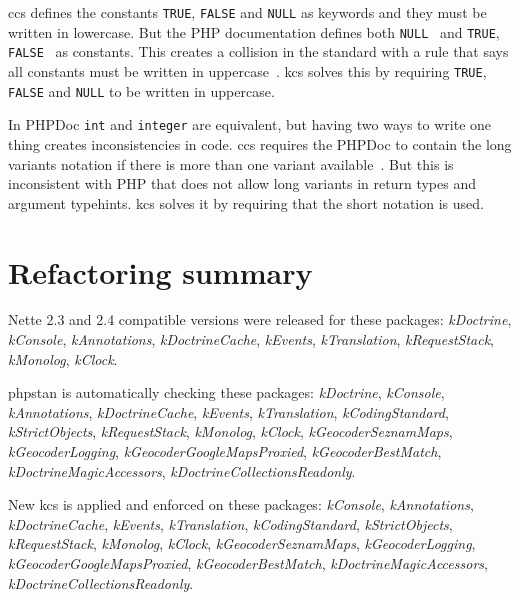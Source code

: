 \gls{ccs} defines the constants \lstinline{TRUE}, \lstinline{FALSE} and \lstinline{NULL} as keywords and they must be written in lowercase. But the PHP documentation defines both \lstinline{NULL}~\cite{php:manual:null} and \lstinline{TRUE}, \lstinline{FALSE}~\cite{php:manual:boolean} as constants. This creates a collision in the standard with a rule that says all constants must be written in uppercase~\cite{consistence:coding-standard}. \gls{kcs} solves this by requiring \lstinline{TRUE}, \lstinline{FALSE} and \lstinline{NULL} to be written in uppercase.


In PHPDoc \lstinline{int} and \lstinline{integer} are equivalent, but having two ways to write one thing creates inconsistencies in code. \gls{ccs} requires the PHPDoc to contain the long variants notation if there is more than one variant available~\cite{consistence:coding-standard}. But this is inconsistent with PHP that does not allow long variants in return types and argument typehints. \gls{kcs} solves it by requiring that the short notation is used.

\section{Refactoring summary}

Nette 2.3 and 2.4 compatible versions were released for these packages: \textit{\gls{kDoctrine}}, \textit{\gls{kConsole}}, \textit{\gls{kAnnotations}}, \textit{\gls{kDoctrineCache}}, \textit{\gls{kEvents}}, \textit{\gls{kTranslation}}, \textit{\gls{kRequestStack}}, \textit{\gls{kMonolog}}, \textit{\gls{kClock}}.

\gls{phpstan} is automatically checking these packages: \textit{\gls{kDoctrine}}, \textit{\gls{kConsole}}, \textit{\gls{kAnnotations}}, \textit{\gls{kDoctrineCache}}, \textit{\gls{kEvents}}, \textit{\gls{kTranslation}}, \textit{\gls{kCodingStandard}}, \textit{\gls{kStrictObjects}}, \textit{\gls{kRequestStack}}, \textit{\gls{kMonolog}}, \textit{\gls{kClock}}, \textit{\gls{kGeocoderSeznamMaps}}, \textit{\gls{kGeocoderLogging}}, \textit{\gls{kGeocoderGoogleMapsProxied}}, \textit{\gls{kGeocoderBestMatch}}, \textit{\gls{kDoctrineMagicAccessors}}, \textit{\gls{kDoctrineCollectionsReadonly}}.

New \acrlong{kcs} is applied and enforced on these packages:  \textit{\gls{kConsole}}, \textit{\gls{kAnnotations}}, \textit{\gls{kDoctrineCache}}, \textit{\gls{kEvents}}, \textit{\gls{kTranslation}}, \textit{\gls{kCodingStandard}}, \textit{\gls{kStrictObjects}}, \textit{\gls{kRequestStack}}, \textit{\gls{kMonolog}}, \textit{\gls{kClock}}, \textit{\gls{kGeocoderSeznamMaps}}, \textit{\gls{kGeocoderLogging}}, \textit{\gls{kGeocoderGoogleMapsProxied}}, \textit{\gls{kGeocoderBestMatch}}, \textit{\gls{kDoctrineMagicAccessors}}, \textit{\gls{kDoctrineCollectionsReadonly}}.
